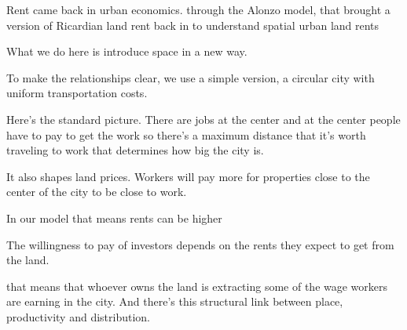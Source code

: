 \documentclass[]{article}
\begin{document}
Rent came back in urban economics. 
through the Alonzo model, %
that brought  a version of Ricardian land rent back in to understand spatial urban land rents %


What we do here is introduce space in a new way.

To make the relationships clear,   %
we use a  simple version, a circular city with uniform transportation costs.

Here's the standard picture. There are jobs at the center and at the center people have to pay to get the work so %
there's a maximum distance that it's worth traveling to work
that determines how big the city is.


It also shapes land prices. Workers will pay more for properties close to the center of the city to be close to work. %

In our model %
that means rents can be higher

The willingness to pay of investors depends on the rents they expect to get from the land.

that means that whoever owns the land is extracting some of the wage workers are earning in the city.
And there's this structural link between place, productivity and distribution. %
\end{document}
